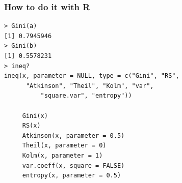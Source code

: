 
\begin{frame} [fragile]
\frametitle{How to do it with R}

\begin{footnotesize}
\begin{verbatim}
> Gini(a)
[1] 0.7945946
> Gini(b)
[1] 0.5578231
> ineq?
ineq(x, parameter = NULL, type = c("Gini", "RS", 
	  "Atkinson", "Theil", "Kolm", "var",
          "square.var", "entropy"))
     
     Gini(x)
     RS(x)
     Atkinson(x, parameter = 0.5)
     Theil(x, parameter = 0)
     Kolm(x, parameter = 1)
     var.coeff(x, square = FALSE)
     entropy(x, parameter = 0.5)
\end{verbatim}
\end{footnotesize}
\end{frame}



% 
% 


% 
% 

